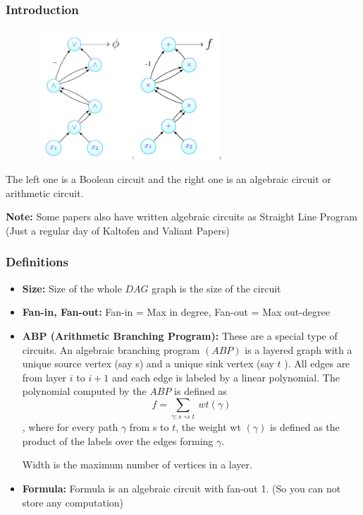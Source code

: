 \documentclass[10pt]{beamer}
\begin{document}

\begin{frame}
	\frametitle{Introduction}
	
	\begin{figure}[h]
	    \centering
	    \includegraphics[width=7cm]{Images/Untitled.png}
	\end{figure}
 The left one is a Boolean circuit and the right one is an algebraic circuit or arithmetic circuit. 
 \vspace{2mm}
 
 \textbf{Note: }Some papers also have written algebraic circuits as Straight Line Program  (Just a regular day of Kaltofen and Valiant Papers)
\end{frame}

\begin{frame}
	\frametitle{Definitions}
	\begin{itemize}
	    \item \textbf{Size:} Size of the whole $DAG$ graph is the size of the circuit
     \item \textbf{Fan-in, Fan-out:} Fan-in = Max in degree, Fan-out = Max out-degree
     \item \textbf{ABP (Arithmetic Branching Program):} These are a special type of circuits. An algebraic branching program $(A B P)$ is a layered graph with a unique source vertex (say s) and a unique sink vertex (say $t$ ). All edges are from layer $i$ to $i+1$ and each edge is labeled by a linear polynomial. The polynomial computed by the $A B P$ is defined as $$f=\sum\limits_{\gamma: s \rightsquigarrow t}\ wt (\gamma)$$, where for every path $\gamma$ from s to $t$, the weight wt $(\gamma)$ is defined as the product of the labels over the edges forming $\gamma$.
     
     Width is the maximum number of vertices in a layer.
     \item \textbf{Formula: }Formula is an algebraic circuit with fan-out 1. (So you can not store any computation)
	\end{itemize}
\end{frame}
\end{document}
